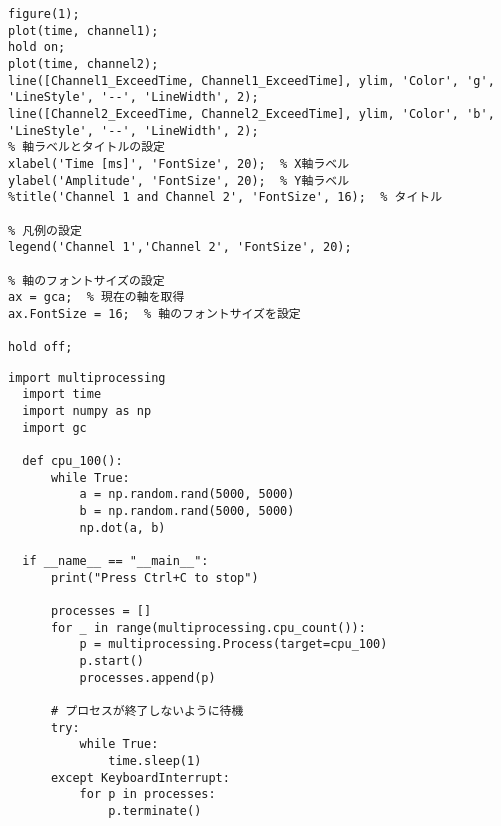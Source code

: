 \begin{lstlisting}[caption=DelayCheck.m]
% グラフ描画
figure(1); 
plot(time, channel1);
hold on;
plot(time, channel2);
line([Channel1_ExceedTime, Channel1_ExceedTime], ylim, 'Color', 'g', 'LineStyle', '--', 'LineWidth', 2);
line([Channel2_ExceedTime, Channel2_ExceedTime], ylim, 'Color', 'b', 'LineStyle', '--', 'LineWidth', 2);
% 軸ラベルとタイトルの設定
xlabel('Time [ms]', 'FontSize', 20);  % X軸ラベル
ylabel('Amplitude', 'FontSize', 20);  % Y軸ラベル
%title('Channel 1 and Channel 2', 'FontSize', 16);  % タイトル

% 凡例の設定
legend('Channel 1','Channel 2', 'FontSize', 20);

% 軸のフォントサイズの設定
ax = gca;  % 現在の軸を取得
ax.FontSize = 16;  % 軸のフォントサイズを設定

hold off;

\end{lstlisting}

\begin{lstlisting}[caption=CPU100.py]
  import multiprocessing
  import time
  import numpy as np
  import gc

  def cpu_100():
      while True:
          a = np.random.rand(5000, 5000)
          b = np.random.rand(5000, 5000)
          np.dot(a, b)

  if __name__ == "__main__":
      print("Press Ctrl+C to stop")
      
      processes = []
      for _ in range(multiprocessing.cpu_count()):
          p = multiprocessing.Process(target=cpu_100)
          p.start()
          processes.append(p)

      # プロセスが終了しないように待機
      try:
          while True:
              time.sleep(1)
      except KeyboardInterrupt:
          for p in processes:
              p.terminate()


\end{lstlisting}